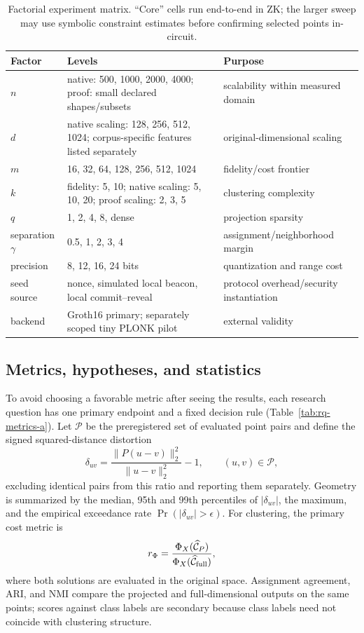 \documentclass[pdflatex,sn-mathphys-num,iicol]{sn-jnl}
\theoremstyle{plain}
\theoremstyle{definition}
\theoremstyle{remark}
\begin{document}
\begin{table}[!htbp]
\caption{Factorial experiment matrix. “Core” cells run end-to-end in ZK; the larger sweep may use symbolic constraint estimates before confirming selected points in-circuit.}\label{tab:matrix-a}
\centering\small
\begin{adjustbox}{max width=\textwidth}
\begin{tabularx}{\textwidth}{@{}Y Y Y@{}}
\toprule
Factor & Levels & Purpose \\
\midrule
$n$ & native: 500, 1000, 2000, 4000; proof: small declared shapes/subsets & scalability within measured domain \\
$d$ & native scaling: 128, 256, 512, 1024; corpus-specific features listed separately & original-dimensional scaling \\
$m$ & 16, 32, 64, 128, 256, 512, 1024 & fidelity/cost frontier \\
$k$ & fidelity: 5, 10; native scaling: 5, 10, 20; proof scaling: 2, 3, 5 & clustering complexity \\
$q$ & 1, 2, 4, 8, dense & projection sparsity \\
separation $\gamma$ & 0.5, 1, 2, 3, 4 & assignment/neighborhood margin \\
precision & 8, 12, 16, 24 bits & quantization and range cost \\
seed source & nonce, simulated local beacon, local commit--reveal & protocol overhead/security instantiation \\
backend & Groth16 primary; separately scoped tiny PLONK pilot & external validity \\
\bottomrule
\end{tabularx}
\end{adjustbox}
\end{table}

\subsection{Metrics, hypotheses, and statistics}
To avoid choosing a favorable metric after seeing the results, each research question has one primary endpoint and a fixed decision rule (Table~\ref{tab:rq-metrics-a}). Let $\mathcal P$ be the preregistered set of evaluated point pairs and define the signed squared-distance distortion
\begin{equation}
\delta_{uv}=\frac{\|P(u-v)\|_2^2}{\|u-v\|_2^2}-1,
\qquad (u,v)\in\mathcal P,
\end{equation}
excluding identical pairs from this ratio and reporting them separately. Geometry is summarized by the median, 95th and 99th percentiles of $|\delta_{uv}|$, the maximum, and the empirical exceedance rate $\Pr(|\delta_{uv}|>\epsilon)$. For clustering, the primary cost metric is
\begin{equation}
r_\Phi=\frac{\Phi_X(\widehat{\mathcal C}_P)}{\Phi_X(\widehat{\mathcal C}_{\rm full})},
\end{equation}
where both solutions are evaluated in the original space. Assignment agreement, ARI, and NMI compare the projected and full-dimensional outputs on the same points; scores against class labels are secondary because class labels need not coincide with clustering structure.
\end{document}
